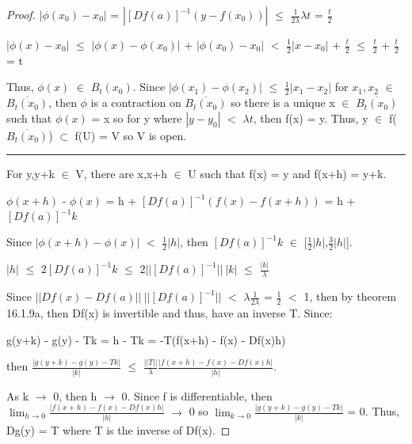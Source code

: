 \begin{proof}
        \hspace{0.5cm}
        $|\phi(x_0) - x_0|$
        = $|[Df(a)]^{-1}(y - f(x_0))|$
        $\leq$ $\frac{1}{2\lambda}\lambda t$ = $\frac{t}{2}$

        \hspace{0.5cm}
        $|\phi(x) -  x_0|$
        $\leq$ $|\phi(x) -  \phi(x_0)|$ + $|\phi(x_0) -  x_0|$
        $<$ $\frac{1}{2}|x - x_0|$ + $\frac{t}{2}$
        $\leq$ $\frac{t}{2}$ + $\frac{t}{2}$ = t

        Thus, $\phi(x)$ $\in$ $B_t(x_0)$.
        Since $|\phi(x_1) - \phi(x_2)|$ $\leq$ $\frac{1}{2}|x_1 - x_2|$
        for $x_1,x_2$ $\in$ $\overline{B_t(x_0)}$, then
        $\phi$ is a contraction on $\overline{B_t(x_0)}$
        so there is a unique x $\in$ $\overline{B_t(x_0)}$
        such that $\phi(x)$ = x so for y where $|y - y_0|$ $<$ $\lambda t$,
        then f(x) = y. Thus, y $\in$ f($\overline{B_t(x_0)}$)
        $\subset$ f(U) = V so V is open.

        \rule[0.1cm]{15.3cm}{0.01cm}

        For y,y+k $\in$ V, there are x,x+h $\in$ U such that
        f(x) = y and f(x+h) = y+k.

        \hspace{0.5cm}
        $\phi(x+h)$ - $\phi(x)$
        = h + $[Df(a)]^{-1}(f(x) - f(x+h))$
        = h + $[Df(a)]^{-1}k$

        Since $|\phi(x+h) - \phi(x)|$ $<$ $\frac{1}{2}|h|$,
        then $[Df(a)]^{-1}k$ $\in$ [$\frac{1}{2}|h|$,$\frac{3}{2}|h|$].

        \hspace{0.5cm}
        $|h|$
        $\leq$ $2[Df(a)]^{-1}k$
        $\leq$ $2||[Df(a)]^{-1}|| \ |k|$
        $\leq$ $\frac{|k|}{\lambda}$

        Since $||Df(x) - Df(a)|| \ ||[Df(a)]^{-1}||$
        $<$ $\lambda \frac{1}{2\lambda}$
        = $\frac{1}{2}$ $<$ 1, then by {\color{red} theorem 16.1.9a},
        then Df(x) is invertible and thus, have an inverse T. Since:

        \hspace{0.5cm}
        g(y+k) - g(y) - Tk
        = h - Tk
        = -T(f(x+h) - f(x) - Df(x)h)

        then
        $\frac{|g(y+k) - g(y) - Tk|}{|k|}$
        $\leq$ $\frac{||T||}{\lambda} \frac{|f(x+h) - f(x) - Df(x)h|}{|h|}$.

        As k $\rightarrow$ 0, then h $\rightarrow$ 0.
        Since f is differentiable, then
        $\lim_{h \rightarrow 0} \frac{|f(x+h) - f(x) - Df(x)h|}{|h|}$
        $\rightarrow$ 0
        so $\lim_{k \rightarrow 0} \frac{|g(y+k) - g(y) - Tk|}{|k|}$ = 0.
        Thus, Dg(y) = T where T is the inverse of Df(x).


\end{proof}
